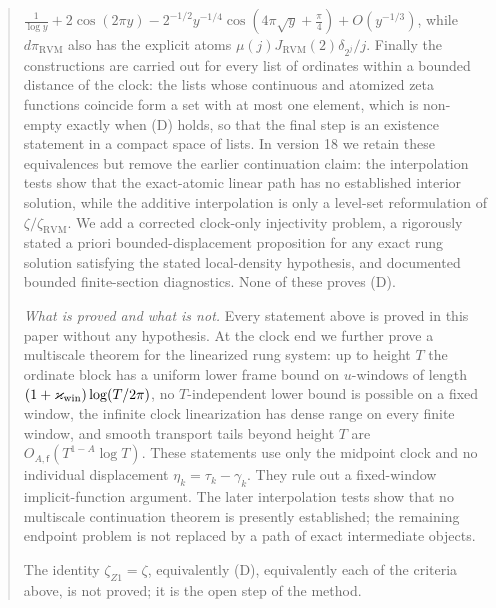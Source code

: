 \documentclass[11pt,reqno]{amsart}
\numberwithin{equation}{section}
\theoremstyle{plain}
\theoremstyle{definition}
\theoremstyle{remark}
\newcommand{\RVM}{\mathrm{RVM}}
\begin{document}
\begin{abstract}
$\frac1{\log y}+2\cos(2\pi y)-2^{-1/2}y^{-1/4}\cos(4\pi\sqrt y+\frac\pi4)+O(y^{-1/3})$, while $d\pi_{\RVM}$ also has the explicit atoms $\mu(j)J_{\RVM}(2)\delta_{2^j}/j$.  Finally the constructions are carried out for every list of ordinates within a bounded distance of the clock: the lists whose continuous and atomized zeta functions coincide form a set with at most one element, which is non-empty exactly when (D) holds, so that the final step is an existence statement in a compact space of lists.  In version 18 we retain these equivalences but remove the earlier continuation claim: the interpolation tests show that the exact-atomic linear path has no established interior solution, while the additive interpolation is only a level-set reformulation of $\zeta/\zeta_{\RVM}$.  We add a corrected clock-only injectivity problem, a rigorously stated a priori bounded-displacement proposition for any exact rung solution satisfying the stated local-density hypothesis, and documented bounded finite-section diagnostics.  None of these proves (D).

\emph{What is proved and what is not.}  Every statement above is proved in this paper without any hypothesis.  At the clock end we further prove a multiscale theorem for the linearized rung system: up to height $T$ the ordinate block has a uniform lower frame bound on $u$-windows of length $(1+\varkappa_{\rm win})\log(T/2\pi)$, no $T$-independent lower bound is possible on a fixed window, the infinite clock linearization has dense range on every finite window, and smooth transport tails beyond height $T$ are $O_{A,\mathsf f}(T^{1-A}\log T)$.  These statements use only the midpoint clock and no individual displacement $\eta_k=\tau_k-\gamma_k$.  They rule out a fixed-window implicit-function argument.  The later interpolation tests show that no multiscale continuation theorem is presently established; the remaining endpoint problem is not replaced by a path of exact intermediate objects.

The identity $\zeta_{Z1}=\zeta$, equivalently (D), equivalently each of the criteria above, is not proved; it is the open step of the method.
\end{abstract}

\maketitle
{}

\tableofcontents
\end{document}
